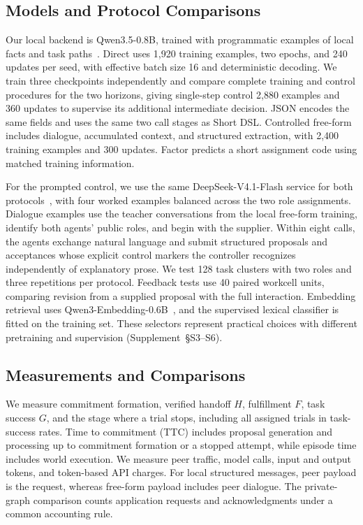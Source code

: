 \documentclass[sigconf,nonacm,balance=false]{aamas}
\begin{document}
\subsection{Models and Protocol Comparisons}
Our local backend is Qwen3.5-0.8B, trained with programmatic examples of local facts and task paths~\cite{qwenteam2026qwen35}. Direct uses 1,920 training examples, two epochs, and 240 updates per seed, with effective batch size 16 and deterministic decoding. We train three checkpoints independently and compare complete training and control procedures for the two horizons, giving single-step control 2,880 examples and 360 updates to supervise its additional intermediate decision. JSON encodes the same fields and uses the same two call stages as Short DSL. Controlled free-form includes dialogue, accumulated context, and structured extraction, with 2,400 training examples and 300 updates. Factor predicts a short assignment code using matched training information.

For the prompted control, we use the same DeepSeek-V4.1-Flash service for both protocols~\cite{deepseek2026api}, with four worked examples balanced across the two role assignments. Dialogue examples use the teacher conversations from the local free-form training, identify both agents' public roles, and begin with the supplier. Within eight calls, the agents exchange natural language and submit structured proposals and acceptances whose explicit control markers the controller recognizes independently of explanatory prose. We test 128 task clusters with two roles and three repetitions per protocol. Feedback tests use 40 paired workcell units, comparing revision from a supplied proposal with the full interaction. Embedding retrieval uses Qwen3-Embedding-0.6B~\cite{qwen3embedding2025}, and the supervised lexical classifier is fitted on the training set. These selectors represent practical choices with different pretraining and supervision (Supplement~\mbox{\S S3--S6}).

\subsection{Measurements and Comparisons}
We measure commitment formation, verified handoff $H$, fulfillment $F$, task success $G$, and the stage where a trial stops, including all assigned trials in task-success rates. Time to commitment (TTC) includes proposal generation and processing up to commitment formation or a stopped attempt, while episode time includes world execution. We measure peer traffic, model calls, input and output tokens, and token-based API charges. For local structured messages, peer payload is the request, whereas free-form payload includes peer dialogue. The private-graph comparison counts application requests and acknowledgments under a common accounting rule.
\end{document}
